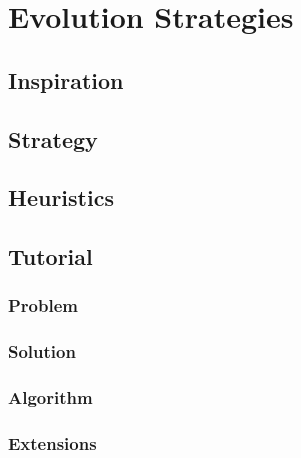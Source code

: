 
\section{Evolution Strategies}

\subsection{Inspiration}


\subsection{Strategy}


\subsection{Heuristics}


\subsection{Tutorial}


\subsubsection{Problem}


\subsubsection{Solution}


\subsubsection{Algorithm}


\subsubsection{Extensions}